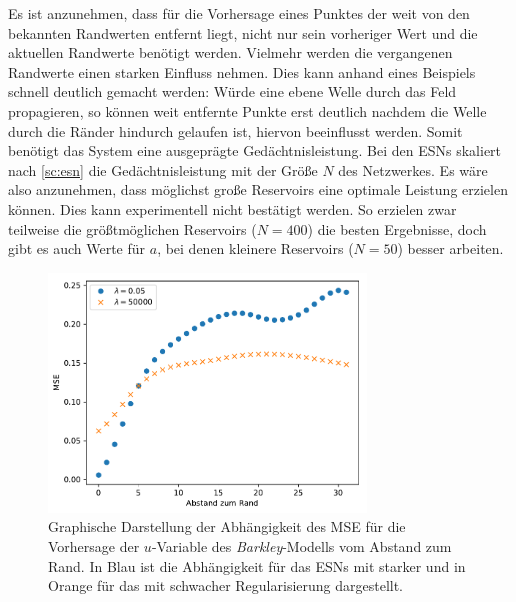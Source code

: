 Es ist anzunehmen, dass für die Vorhersage eines Punktes der weit von den bekannten Randwerten entfernt liegt, nicht nur sein vorheriger Wert und die aktuellen Randwerte benötigt werden. Vielmehr werden die vergangenen Randwerte einen starken Einfluss nehmen. Dies kann anhand eines Beispiels schnell deutlich gemacht werden: Würde eine ebene Welle durch das Feld propagieren, so können weit entfernte Punkte erst deutlich nachdem die Welle durch die Ränder hindurch gelaufen ist, hiervon beeinflusst werden. Somit benötigt das System eine ausgeprägte Gedächtnisleistung. Bei den \textsc{ESN}s skaliert nach \ref{sc:esn} die Gedächtnisleistung mit der Größe $N$ des Netzwerkes. Es wäre also anzunehmen, dass möglichst große Reservoirs eine optimale Leistung erzielen können. Dies kann experimentell nicht bestätigt werden. So erzielen zwar teilweise die größtmöglichen Reservoirs ($N=400$) die besten Ergebnisse, doch gibt es auch Werte für $a$, bei denen kleinere Reservoirs ($N=50$) besser arbeiten.\\

\begin{figure}[h]
	\centering
	\includegraphics[height=2.5in]{figures/results/inner_cross_prediction/inner_errors.pdf}
	\setcapmargin[1cm]{0.5cm}
	\caption{Graphische Darstellung der Abhängigkeit des MSE für die Vorhersage der $u$-Variable des \textit{Barkley}-Modells vom Abstand zum Rand. In Blau ist die Abhängigkeit für das \textsc{ESN}s mit starker und in Orange für das mit schwacher Regularisierung dargestellt.}
	\label{fig:exp_inner_cross_barkley_esn_error_dependency_comparison}
\end{figure} 

